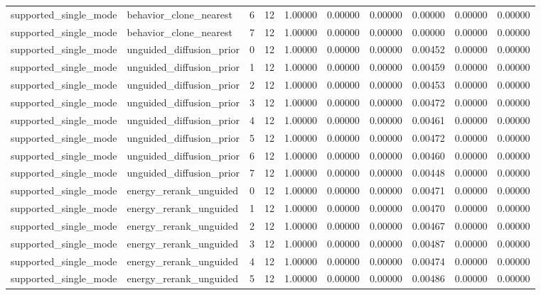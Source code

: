 \documentclass{article}
\begin{document}
\begin{table}[tbp]
{\begin{tabular}{llllllllll}
supported\_single\_mode & behavior\_clone\_nearest & 6 & 12 & 1.00000 & 0.00000 & 0.00000 & 0.00000 & 0.00000 & 0.00000 \\
supported\_single\_mode & behavior\_clone\_nearest & 7 & 12 & 1.00000 & 0.00000 & 0.00000 & 0.00000 & 0.00000 & 0.00000 \\
supported\_single\_mode & unguided\_diffusion\_prior & 0 & 12 & 1.00000 & 0.00000 & 0.00000 & 0.00452 & 0.00000 & 0.00000 \\
supported\_single\_mode & unguided\_diffusion\_prior & 1 & 12 & 1.00000 & 0.00000 & 0.00000 & 0.00459 & 0.00000 & 0.00000 \\
supported\_single\_mode & unguided\_diffusion\_prior & 2 & 12 & 1.00000 & 0.00000 & 0.00000 & 0.00453 & 0.00000 & 0.00000 \\
supported\_single\_mode & unguided\_diffusion\_prior & 3 & 12 & 1.00000 & 0.00000 & 0.00000 & 0.00472 & 0.00000 & 0.00000 \\
supported\_single\_mode & unguided\_diffusion\_prior & 4 & 12 & 1.00000 & 0.00000 & 0.00000 & 0.00461 & 0.00000 & 0.00000 \\
supported\_single\_mode & unguided\_diffusion\_prior & 5 & 12 & 1.00000 & 0.00000 & 0.00000 & 0.00472 & 0.00000 & 0.00000 \\
supported\_single\_mode & unguided\_diffusion\_prior & 6 & 12 & 1.00000 & 0.00000 & 0.00000 & 0.00460 & 0.00000 & 0.00000 \\
supported\_single\_mode & unguided\_diffusion\_prior & 7 & 12 & 1.00000 & 0.00000 & 0.00000 & 0.00448 & 0.00000 & 0.00000 \\
supported\_single\_mode & energy\_rerank\_unguided & 0 & 12 & 1.00000 & 0.00000 & 0.00000 & 0.00471 & 0.00000 & 0.00000 \\
supported\_single\_mode & energy\_rerank\_unguided & 1 & 12 & 1.00000 & 0.00000 & 0.00000 & 0.00470 & 0.00000 & 0.00000 \\
supported\_single\_mode & energy\_rerank\_unguided & 2 & 12 & 1.00000 & 0.00000 & 0.00000 & 0.00467 & 0.00000 & 0.00000 \\
supported\_single\_mode & energy\_rerank\_unguided & 3 & 12 & 1.00000 & 0.00000 & 0.00000 & 0.00487 & 0.00000 & 0.00000 \\
supported\_single\_mode & energy\_rerank\_unguided & 4 & 12 & 1.00000 & 0.00000 & 0.00000 & 0.00474 & 0.00000 & 0.00000 \\
supported\_single\_mode & energy\_rerank\_unguided & 5 & 12 & 1.00000 & 0.00000 & 0.00000 & 0.00486 & 0.00000 & 0.00000 \\

\end{tabular}}
\end{table}
\end{document}
